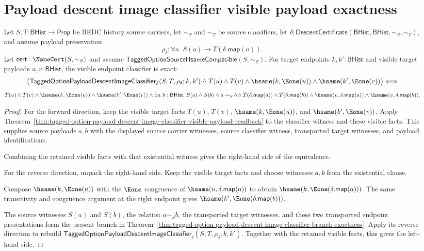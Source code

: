 \section{Payload descent image classifier visible payload exactness}

\begin{theorem}
\label{thm:tagged-option-payload-descent-image-classifier-visible-payload-exactness}
Let $S,T:\mathsf{BHist}\to\mathsf{Prop}$ be BEDC history source carriers, let
$\sim_S$ and $\sim_T$ be source classifiers, let
$\delta:\mathsf{DescentCertificate}(\mathsf{BHist},\mathsf{BHist},\sim_S,\sim_T)$,
and assume payload preservation
$$
\rho_{\delta}:\forall a.\;S(a)\to T(\delta.\mathsf{map}(a)).
$$
Let $\mathsf{cert}:\NameCert(S,\sim_S)$ and assume
$\mathsf{TaggedOptionSourceHsameCompatible}(S,\sim_S)$. For target endpoints
$k,k':\mathsf{BHist}$ and visible target payloads $u,v:\mathsf{BHist}$, the
visible endpoint classifier is exact:
$$
\bigl(
\mathsf{TaggedOptionPayloadDescentImageClassifier}_{\delta}
(S,T,\rho_{\delta};k,k')
\land T(u)\land T(v)\land
\hsame(k,\Eone(u))\land
\hsame(k',\Eone(v))
\bigr)
\Longleftrightarrow
$$
$$
T(u)\land T(v)\land
\hsame(k,\Eone(u))\land
\hsame(k',\Eone(v))\land
\exists a,b:\mathsf{BHist}.\;
S(a)\land S(b)\land a\sim_S b\land
T(\delta.\mathsf{map}(a))\land T(\delta.\mathsf{map}(b))\land
\hsame(u,\delta.\mathsf{map}(a))\land
\hsame(v,\delta.\mathsf{map}(b)).
$$
\end{theorem}
\begin{proof}
For the forward direction, keep the visible target facts
$T(u)$, $T(v)$, $\hsame(k,\Eone(u))$, and $\hsame(k',\Eone(v))$. Apply
Theorem~\ref{thm:tagged-option-payload-descent-image-classifier-visible-payload-readback}
to the classifier witness and these visible facts. This supplies source
payloads $a,b$ with the displayed source carrier witnesses, source classifier
witness, transported target witnesses, and payload identifications.

Combining the retained visible facts with that existential witness gives the
right-hand side of the equivalence.

For the reverse direction, unpack the right-hand side. Keep the visible target
facts and choose witnesses $a,b$ from the existential clause.

Compose $\hsame(k,\Eone(u))$ with the $\Eone$ congruence of
$\hsame(u,\delta.\mathsf{map}(a))$ to obtain
$\hsame(k,\Eone(\delta.\mathsf{map}(a)))$. The same transitivity and congruence
argument at the right endpoint gives
$\hsame(k',\Eone(\delta.\mathsf{map}(b)))$.

The source witnesses $S(a)$ and $S(b)$, the relation $a\sim_S b$, the transported
target witnesses, and these two transported endpoint presentations form the
present branch in
Theorem~\ref{thm:tagged-option-payload-descent-image-classifier-branch-exactness}.
Apply its reverse direction to rebuild
$\mathsf{TaggedOptionPayloadDescentImageClassifier}_{\delta}
(S,T,\rho_{\delta};k,k')$. Together with the retained visible facts, this gives
the left-hand side.
\end{proof}
